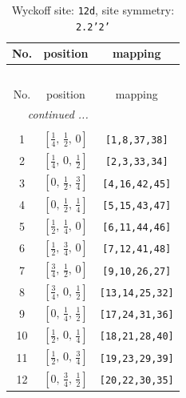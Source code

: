 \documentclass[fleqn,8pt]{jsarticle}
\begin{document}
\begin{longtable}{ccc}
\caption{Wyckoff site: {\tt 12d}, site symmetry: {\tt 2.2'2'}}
 \\
 \hline \hline
No. & position & mapping \\ \hline \endfirsthead

\multicolumn{2}{l}{\tablename\ \thetable{}} \\
 \hline \hline
No. & position & mapping \\ \hline \endhead

 \hline \hline
\multicolumn{2}{r}{\footnotesize\it continued ...} \\ \endfoot

 \hline \hline
\multicolumn{2}{r}{} \\ \endlastfoot

1 & $\left[ \frac{1}{4},\, \frac{1}{2},\, 0 \right]$ & {\tt [1,8,37,38]} \\ \hline
2 & $\left[ \frac{1}{4},\, 0,\, \frac{1}{2} \right]$ & {\tt [2,3,33,34]} \\ \hline
3 & $\left[ 0,\, \frac{1}{2},\, \frac{3}{4} \right]$ & {\tt [4,16,42,45]} \\ \hline
4 & $\left[ 0,\, \frac{1}{2},\, \frac{1}{4} \right]$ & {\tt [5,15,43,47]} \\ \hline
5 & $\left[ \frac{1}{2},\, \frac{1}{4},\, 0 \right]$ & {\tt [6,11,44,46]} \\ \hline
6 & $\left[ \frac{1}{2},\, \frac{3}{4},\, 0 \right]$ & {\tt [7,12,41,48]} \\ \hline
7 & $\left[ \frac{3}{4},\, \frac{1}{2},\, 0 \right]$ & {\tt [9,10,26,27]} \\ \hline
8 & $\left[ \frac{3}{4},\, 0,\, \frac{1}{2} \right]$ & {\tt [13,14,25,32]} \\ \hline
9 & $\left[ 0,\, \frac{1}{4},\, \frac{1}{2} \right]$ & {\tt [17,24,31,36]} \\ \hline
10 & $\left[ \frac{1}{2},\, 0,\, \frac{1}{4} \right]$ & {\tt [18,21,28,40]} \\ \hline
11 & $\left[ \frac{1}{2},\, 0,\, \frac{3}{4} \right]$ & {\tt [19,23,29,39]} \\ \hline
12 & $\left[ 0,\, \frac{3}{4},\, \frac{1}{2} \right]$ & {\tt [20,22,30,35]} \\
\end{longtable}
\renewcommand{\arraystretch}{1.2}
\end{document}
